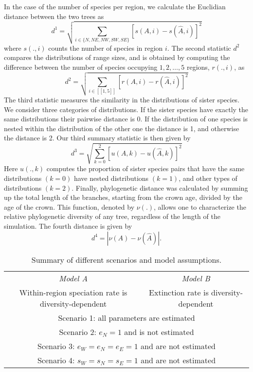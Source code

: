 In the case of the number of species per region, we calculate the Euclidian distance between the two trees as
\begin{equation}
	d^1= \sqrt{\sum_{i \in \{N,NE,NW,SW,SE\}}[ s(A ,i)-s(\hat{A},i)]^2 }
\label{eq:d1}
\end{equation}
where $s(.,i)$ counts the number of species in region $i$. 
The second statistic $d^2$ compares the distributions of range sizes, and is obtained by computing the difference between the number of species occupying $1,2, \ldots, 5$ regions, $r(.,i)$, as
\begin{equation}
	d^2= \sqrt{\sum_{i \in [\![1,5]\!]}[r(A ,i)-r(\hat{A},i)]^2 }
\label{eq:d2}
\end{equation}
 The third statistic measures the similarity in the distributions of sister species. 
 We consider three categories of distributions. 
 If the sister species have exactly the same distributions their pairwise distance is 0.
 If the distribution of one species is nested within the distribution of the other one the distance is 1, and otherwise the distance is 2.  
 Our third summary statistic is then given by 
 \begin{equation}
	d^3= \sqrt{\sum_{k = 0}^2[ u(A ,k)-u(\hat{A},k)]^2 }
\label{eq:d3}
\end{equation}
Here $u(.,k)$ computes the proportion of sister species pairs that have the same distributions $(k=0)$ have nested distributions $(k=1)$, and other types of distributions $(k=2)$. 
Finally, phylogenetic distance was calculated by summing up the total length of the branches, starting from the crown age, divided by the age of the crown. 
This function, denoted by $\nu(.)$, allows one to characterize the relative phylogenetic diversity of any tree, regardless of the length of the simulation. 
The fourth distance is given by
\begin{equation}
	d^4=|\nu(A)- \nu(\hat{A})|.	
\label{eq:d4}
\end{equation}
\begin{table*}[b]
\caption{Summary of different scenarios and model assumptions.} \label{tab:1}
\centering
\begin{tabular}{cc}
\hline
\textit{Model A} & \textit{Model B} \\
Within-region speciation rate is diversity-dependent &  Extinction rate is diversity-dependent \\ 
\hline
\multicolumn{2}{c}{Scenario 1: all parameters are estimated}  \\
\multicolumn{2}{c}{Scenario 2: $e_N = 1$ and is not estimated} \\
\multicolumn{2}{c}{Scenario 3: $e_W = e_N = e_E = 1$ and are not estimated}\\
\multicolumn{2}{c}{Scenario 4: $s_W = s_N = s_E = 1$ and are not estimated} \\
\hline
\end{tabular}
\end{table*}
%

